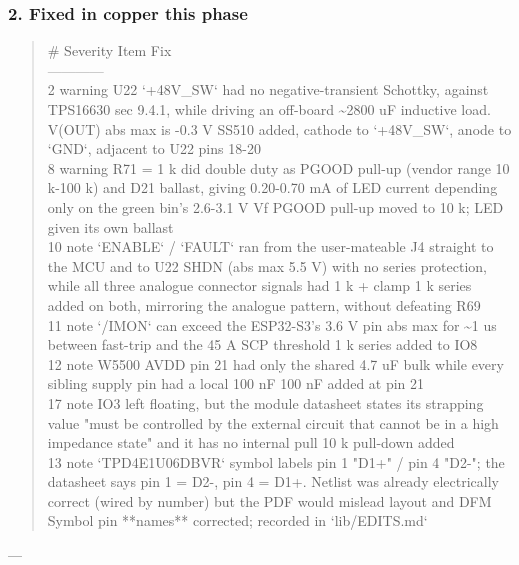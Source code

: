 \documentclass[11pt,a4paper]{article}
\begin{document}
\subsubsection*{2. Fixed in copper this phase}
\begin{quote}\small\ttfamily\raggedright
\textbar{} \# \textbar{} Severity \textbar{} Item \textbar{} Fix \textbar{}\\
\textbar{}---\textbar{}---\textbar{}---\textbar{}---\textbar{}\\
\textbar{} 2 \textbar{} warning \textbar{} U22 `+48V\_SW` had no negative-transient Schottky, against TPS16630 sec 9.4.1, while driving an off-board \textasciitilde{}2800 uF inductive load. V(OUT) abs max is -0.3 V \textbar{} SS510 added, cathode to `+48V\_SW`, anode to `GND`, adjacent to U22 pins 18-20 \textbar{}\\
\textbar{} 8 \textbar{} warning \textbar{} R71 = 1 k did double duty as PGOOD pull-up (vendor range 10 k-100 k) and D21 ballast, giving 0.20-0.70 mA of LED current depending only on the green bin's 2.6-3.1 V Vf \textbar{} PGOOD pull-up moved to 10 k; LED given its own ballast \textbar{}\\
\textbar{} 10 \textbar{} note \textbar{} `ENABLE` / `FAULT` ran from the user-mateable J4 straight to the MCU and to U22 SHDN (abs max 5.5 V) with no series protection, while all three analogue connector signals had 1 k + clamp \textbar{} 1 k series added on both, mirroring the analogue pattern, without defeating R69 \textbar{}\\
\textbar{} 11 \textbar{} note \textbar{} `/IMON` can exceed the ESP32-S3's 3.6 V pin abs max for \textasciitilde{}1 us between fast-trip and the 45 A SCP threshold \textbar{} 1 k series added to IO8 \textbar{}\\
\textbar{} 12 \textbar{} note \textbar{} W5500 AVDD pin 21 had only the shared 4.7 uF bulk while every sibling supply pin had a local 100 nF \textbar{} 100 nF added at pin 21 \textbar{}\\
\textbar{} 17 \textbar{} note \textbar{} IO3 left floating, but the module datasheet states its strapping value "must be controlled by the external circuit that cannot be in a high impedance state" and it has no internal pull \textbar{} 10 k pull-down added \textbar{}\\
\textbar{} 13 \textbar{} note \textbar{} `TPD4E1U06DBVR` symbol labels pin 1 "D1+" / pin 4 "D2-"; the datasheet says pin 1 = D2-, pin 4 = D1+. Netlist was already electrically correct (wired by number) but the PDF would mislead layout and DFM \textbar{} Symbol pin {*}{*}names{*}{*} corrected; recorded in `lib/EDITS.md` \textbar{}
\end{quote}
---
\end{document}
